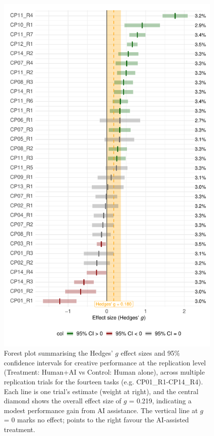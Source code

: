 \documentclass[manuscript, screen, review, acmsmall, anonymous]{acmart}
\begin{document}
\begin{figure}[H]
  \centering
  \includegraphics[width=\linewidth,
                 height=0.9\textheight,
                 keepaspectratio]{plot_performance_raw_forest}
  \caption{Forest plot summarising the Hedges’ $g$ effect sizes and 95\% confidence intervals for creative performance at the replication level (Treatment: Human+AI vs Control: Human alone), across multiple replication trials for the fourteen tasks (e.g. CP01\_R1-CP14\_R4). Each line is one trial’s estimate (weight at right), and the central diamond shows the overall effect size of $g$ = 0.219, indicating a modest performance gain from AI assistance. The vertical line at $g$ = 0 marks no effect; points to the right favour the AI‑assisted treatment.}
  \label{fig:performance_raw_forest}
\end{figure}
\end{document}
